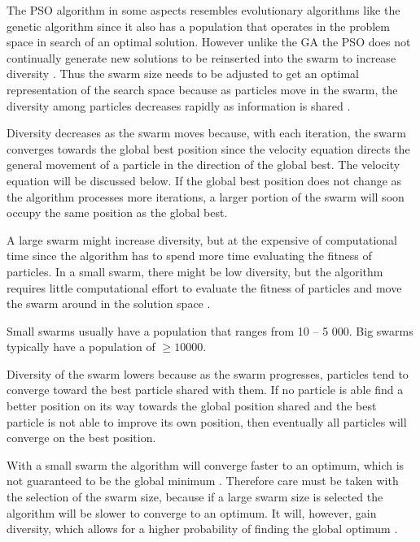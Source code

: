 The PSO algorithm in some aspects resembles evolutionary algorithms like the genetic algorithm since it also has a population that operates in the problem space in search of an optimal solution. However unlike the GA the PSO does not continually generate new solutions to be reinserted into the swarm to increase diversity \cite{PSOHybridUnitCommit}. Thus the swarm size needs to be adjusted to get an optimal representation of the search space because as particles move in the swarm, the diversity among particles decreases rapidly as information is shared \cite{FundamentalSwarm,CompuIntelligenceIntro}. 

Diversity decreases as the swarm moves because, with each iteration, the swarm converges towards the global best position\cite{PSOHybridJobShop,CompuIntelligenceIntro,FundamentalSwarm} since the velocity equation directs the general movement of a particle in the direction of the global best\cite{PSOHybridJobShop,CompuIntelligenceIntro,FundamentalSwarm}. The velocity equation will be discussed below\cite{PSOHybridJobShop,CompuIntelligenceIntro,FundamentalSwarm}. If the global best position does not change as the algorithm processes more iterations, a larger portion of the swarm will soon occupy the same position as the global best\cite{PSOHybridJobShop,CompuIntelligenceIntro,FundamentalSwarm}.

A large swarm might increase diversity, but at the expensive of computational time since the algorithm has to spend more time evaluating the fitness of particles\cite{FundamentalSwarm,CompuIntelligenceIntro}. In a small swarm, there might be low diversity, but the algorithm requires little computational effort to evaluate the fitness of particles and move the swarm around in the solution space \cite{FundamentalSwarm,CompuIntelligenceIntro}.

Small swarms usually have a population that ranges from 10 -- 5 000. Big swarms typically have a population of $\geq 10 000$\cite{PSOSelfHierarch,PSOPheromones,PSOAttractRepulse}. 

Diversity of the swarm lowers because as the swarm progresses, particles tend to converge toward the best particle shared with them. If no particle is able find a better position on its way towards the global position shared and the best particle is not able to improve its own position, then eventually all particles will converge on the best position\cite{CompuIntelligenceIntro,FundamentalSwarm}.

With a small swarm the algorithm will converge faster to an optimum, which is not guaranteed to be the global minimum \cite{FundamentalSwarm,CompuIntelligenceIntro}. Therefore care must be taken with the selection of the swarm size, because if a large swarm size is selected the algorithm will be slower to converge to an optimum. It will, however, gain diversity, which allows for a higher probability of finding the global optimum \cite{PSOPESO}.

